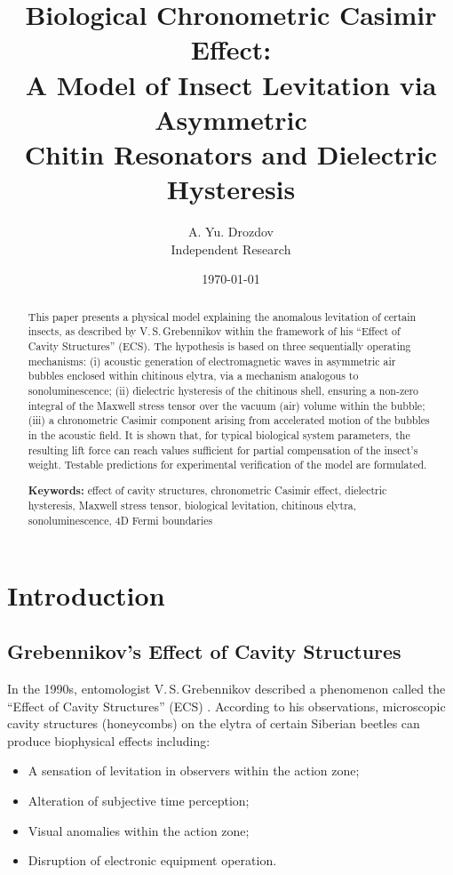 \documentclass[12pt,a4paper]{article}
\title{\textbf{Biological Chronometric Casimir Effect:\\
A Model of Insect Levitation via Asymmetric\\
Chitin Resonators and Dielectric Hysteresis}}
\author{A. Yu. Drozdov \\
\small Independent Research}
\date{\today}
\begin{document}
\maketitle

\begin{abstract}
\noindent
This paper presents a physical model explaining the anomalous levitation of certain insects, as described by V.\,S.\,Grebennikov within the framework of his ``Effect of Cavity Structures'' (ECS). The hypothesis is based on three sequentially operating mechanisms: (i) acoustic generation of electromagnetic waves in asymmetric air bubbles enclosed within chitinous elytra, via a mechanism analogous to sonoluminescence; (ii) dielectric hysteresis of the chitinous shell, ensuring a non-zero integral of the Maxwell stress tensor over the vacuum (air) volume within the bubble; (iii) a chronometric Casimir component arising from accelerated motion of the bubbles in the acoustic field. It is shown that, for typical biological system parameters, the resulting lift force can reach values sufficient for partial compensation of the insect's weight. Testable predictions for experimental verification of the model are formulated.

\bigskip
\noindent\textbf{Keywords:} effect of cavity structures, chronometric Casimir effect, dielectric hysteresis, Maxwell stress tensor, biological levitation, chitinous elytra, sonoluminescence, 4D Fermi boundaries
\end{abstract}

\tableofcontents

\newpage

\section{Introduction}

\subsection{Grebennikov's Effect of Cavity Structures}

In the 1990s, entomologist V.\,S.\,Grebennikov described a phenomenon called the ``Effect of Cavity Structures'' (ECS) \cite{grebennikov}. According to his observations, microscopic cavity structures (honeycombs) on the elytra of certain Siberian beetles can produce biophysical effects including:
\begin{itemize}
    \item A sensation of levitation in observers within the action zone;
    \item Alteration of subjective time perception;
    \item Visual anomalies within the action zone;
    \item Disruption of electronic equipment operation.
\end{itemize}
\end{document}
